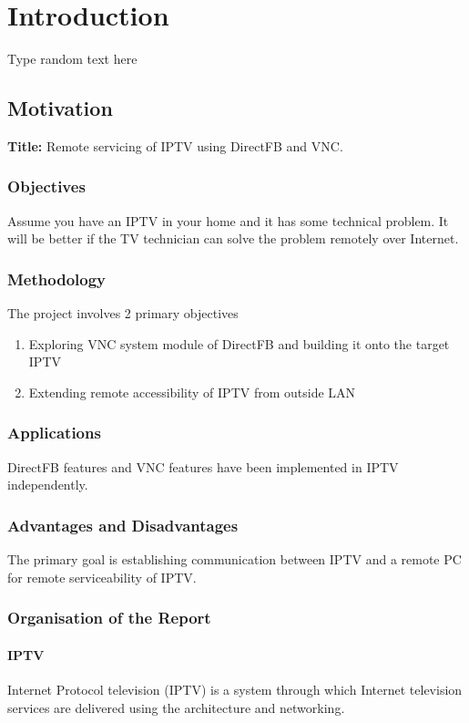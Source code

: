 \chapter{Introduction}
Type random text here
\section{Motivation}
\textbf{Title:} Remote servicing of IPTV using DirectFB and VNC.

\subsection{Objectives}
Assume you have an IPTV in your home and it has some technical problem. It will be better if the TV technician can solve the problem remotely over Internet. 

\subsection{Methodology}
The project involves 2 primary objectives
\begin{enumerate}
\item Exploring VNC system module of DirectFB and building it onto the target IPTV
\item Extending remote accessibility of IPTV from outside LAN
\end{enumerate}

\subsection{Applications}
DirectFB features and VNC features have been implemented in IPTV independently.

\subsection{Advantages and Disadvantages}
The primary goal is establishing communication between IPTV and a remote PC for remote serviceability of IPTV.

\subsection{Organisation of the Report}

\subsubsection{IPTV}
	Internet Protocol television (IPTV) is a system through which Internet television services are delivered using the architecture and networking.\cite{IPTV}\\

